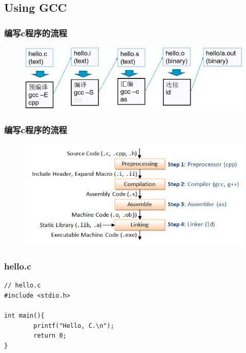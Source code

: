 \documentclass{beamer}
\begin{document}
\subsection{Using GCC}
\begin{frame}
\frametitle{编写c程序的流程}
\begin{figure}
\includegraphics[width=1\linewidth]{602}
\end{figure}
\end{frame}
\begin{frame}
\frametitle{编写c程序的流程}
\begin{figure}
\includegraphics[width=1\linewidth]{603}
\end{figure}
\end{frame}

\begin{frame}[fragile]
\frametitle{hello.c}
\begin{example}
\begin{verbatim}
// hello.c
#include <stdio.h>

int main(){
        printf("Hello, C.\n");
        return 0;
}
\end{verbatim}
\end{example}
\end{frame}
\end{document}
